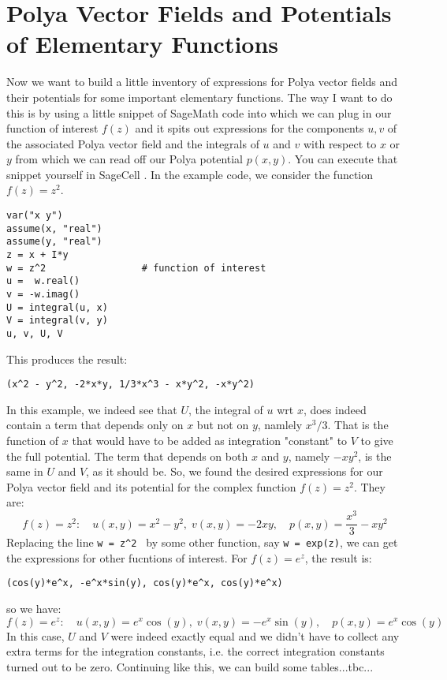 \documentclass[12pt]{article}
\begin{document}
\section{Polya Vector Fields and Potentials of Elementary Functions}
Now we want to build a little inventory of expressions for Polya vector fields and their potentials for some important elementary functions. The way I want to do this is by using a little snippet of SageMath code into which we can plug in our function of interest $f(z)$ and it spits out expressions for the components $u,v$ of the associated Polya vector field and the integrals of $u$ and $v$ with respect to $x$ or $y$ from which we can read off our Polya potential $p(x,y)$. You can execute that snippet yourself in SageCell \cite{SageCell}. In the example code, we consider the function $f(z) = z^2$.
\begin{verbatim}
var("x y")
assume(x, "real")
assume(y, "real")
z = x + I*y
w = z^2                 # function of interest
u =  w.real() 
v = -w.imag()
U = integral(u, x)
V = integral(v, y)
u, v, U, V	
\end{verbatim}
This produces the result:
\begin{verbatim}
(x^2 - y^2, -2*x*y, 1/3*x^3 - x*y^2, -x*y^2)
\end{verbatim}
In this example, we indeed see that $U$, the integral of $u$ wrt $x$, does indeed contain a term that depends only on $x$ but not on $y$, namlely $x^3/3$. That is the function of $x$ that would have to be added as integration "constant" to $V$ to give the full potential. The term that depends on both $x$ and $y$, namely $-x y^2$, is the same in $U$ and $V$, as it should be. So, we found the desired expressions for our Polya vector field and its potential for the complex function $f(z) = z^2$. They are:
\begin{equation}
f(z) = z^2: \quad 
u(x,y) = x^2 - y^2, \; 
v(x,y) = -2 x y, \quad 
p(x,y) = \frac{x^3}{3} -x y^2
\end{equation}
Replacing the line \texttt{w = z\textasciicircum2 } by some other function, say \texttt{w = exp(z)}, we can get the expressions for other fucntions of interest. For $f(z) = e^z$, the result is:
\begin{verbatim}
(cos(y)*e^x, -e^x*sin(y), cos(y)*e^x, cos(y)*e^x)
\end{verbatim}
so we have:
\begin{equation}
f(z) = e^z: \quad 
u(x,y) =  e^x \cos(y), \; 
v(x,y) = -e^x \sin(y), \quad 
p(x,y) =  e^x \cos(y)
\end{equation}
In this case, $U$ and $V$ were indeed exactly equal and we didn't have to collect any extra terms for the integration constants, i.e. the correct integration constants turned out to be zero. Continuing like this, we can build some tables...tbc...
\end{document}

